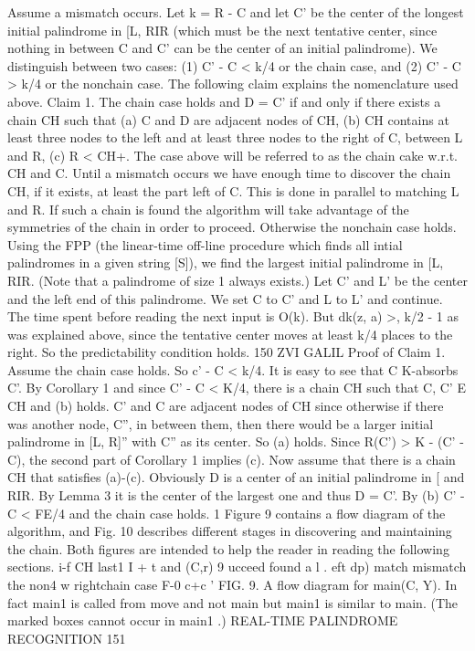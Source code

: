 \documentclass[11pt,a4paper]{report}
\begin{document}
Assume a mismatch occurs. Let k = R - C and let C’ be the center of the longest
initial palindrome in [L, RIR (which must be the next tentative center, since nothing in
between C and C’ can be the center of an initial palindrome).
We distinguish between two cases: (1) C’ - C < k/4 or the chain case, and (2)
C’ - C > k/4 or the nonchain case.
The following claim explains the nomenclature used above.
Claim 1. The chain case holds and D = C’ if and only if there exists a chain CH
such that
(a) C and D are adjacent nodes of CH,
(b) CH contains at least three nodes to the left and at least three nodes to the
right of C, between L and R,
(c) R < CH+.
The case above will be referred to as the chain cake w.r.t. CH and C. Until a mismatch
occurs we have enough time to discover the chain CH, if it exists, at least the part left
of C. This is done in parallel to matching L and R. If such a chain is found the algorithm
will take advantage of the symmetries of the chain in order to proceed. Otherwise the
nonchain case holds. Using the FPP (the linear-time off-line procedure which finds
all intial palindromes in a given string [S]), we find the largest initial palindrome in [L, RIR.
(Note that a palindrome of size 1 always exists.) Let C’ and L’ be the center and the left
end of this palindrome. We set C to C’ and L to L’ and continue. The time spent before
reading the next input is O(k). But dk(z, a) >, k/2 - 1 as was explained above, since
the tentative center moves at least k/4 places to the right. So the predictability condition
holds. 
150 ZVI GALIL
Proof of Claim 1. Assume the chain case holds. So c’ - C < k/4. It is easy to see
that C K-absorbs C’. By Corollary 1 and since C’ - C < K/4, there is a chain CH such
that C, C’ E CH and (b) holds. C’ and C are adjacent nodes of CH since otherwise if
there was another node, C”, in between them, then there would be a larger initial palindrome in [L, R]” with C” as its center. So (a) holds. Since R(C’) > K - (C’ - C), the
second part of Corollary 1 implies (c).
Now assume that there is a chain CH that satisfies (a)-(c). Obviously D is a center of an
initial palindrome in [ and  RIR. By Lemma 3 it is the center of the largest one and thus
D = C’. By (b) C’ - C < FE/4 and the chain case holds. 1
Figure 9 contains a flow diagram of the algorithm, and Fig. 10 describes different
stages in discovering and maintaining the chain. Both figures are intended to help the
reader in reading the following sections.
i-f
CH last1 I
+ t
 and (C,r)
9
ucceed
found a l .
eft dp) match mismatch
the non4 w
rightchain case
F-0
c+c '
FIG. 9. A flow diagram for main(C, Y). In fact main1 is called from move and not main but main1
is similar to main. (The marked boxes cannot occur in main1 .) 
REAL-TIME PALINDROME RECOGNITION 151
\end{document}
